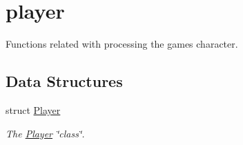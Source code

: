 \hypertarget{group__player}{}\section{player}
\label{group__player}


Functions related with processing the game\textquotesingle{}s character.  


\subsection*{Data Structures}
\begin{DoxyCompactItemize}
\item 
struct \hyperlink{struct_player}{Player}
\begin{DoxyCompactList}\small\item\em The \hyperlink{struct_player}{Player} \char`\"{}class\char`\"{}. \end{DoxyCompactList}\end{DoxyCompactItemize}
